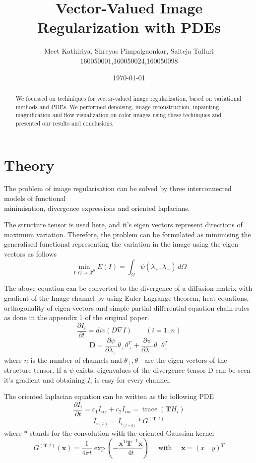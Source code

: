 \documentclass[a4paper]{article}
\title{Vector-Valued Image Regularization with PDEs}
\author{Meet Kathiriya, Shreyas Pimpalgaonkar, Saiteja Talluri \\ 160050001,160050024,160050098}
\date{\today}
\begin{document}
\maketitle

\begin{abstract}

We focussed on techiniques for vector-valued image regularization, based on variational methods and PDEs. We performed denoising, image reconstruction, inpainting, magnification and flow visualization on color images using these techinques and presented our results and conclusions.
\end{abstract}

\section{Theory}
\label{sec:theory}
\hspace{5mm}The problem of image regularisation can be solved by three interconnected models of functional \\ minimisation, divergence expressions and oriented laplacians. 

The structure tensor is used here, and it's eigen vectors represent directions of maximum variation. Therefore, the problem can be formulated as minimising the generalised functional representing the variation in the image using the eigen vectors as follows
$$\min_{I:\Omega\to\mathcal{R}^{n}} E(I) = \int_{\Omega} \psi(\lambda_{+},\lambda_{-})\,d\Omega$$

 The above equation can be converted to the divergence of a diffusion matrix with gradient of the Image channel by using Euler-Lagrange theorem, heat equations, orthogonality of eigen vectors and simple partial differential equation chain rules as done in the appendix 1 of the original paper. 
        $$\frac{\partial I_i}{\partial t} = div ( D \nabla I )          \qquad  (i = 1..n) $$ 
        $$ \textbf{D} = \frac{\partial \psi}{\partial \lambda_+} \theta_+ \theta_+^T  +  \frac{\partial \psi}{\partial \lambda_-} \theta_- \theta_-^T$$
    where $n$ is the number of channels and $\theta_+,\theta_-$ are the eigen vectors of the structure tensor. If a $\psi$ exists, eigenvalues of the divergence tensor D can be seen it's gradient and obtaining $I_i$ is easy for every channel.
    
The oriented laplacian equation can be written as the following PDE
$$\frac { \partial I _ { i } } { \partial t } = c _ { 1 } I _ { i \epsilon \varepsilon } + c _ { 2 } I _ { i m } = \operatorname { trace } \left( \mathbf { T } H _ { i } \right)$$
 $$ I _ { i ( t ) } = I _ { i _ { ( t = 0 ) } } * G ^ { ( \mathbf { T } , t ) }$$ 
where $*$ stands for the convolution with the oriented Gaussian kernel 
$$G ^ { ( \mathbf { T } , t ) } ( \mathbf { x } ) = \frac { 1 } { 4 \pi t } \exp \left( - \frac { \mathbf { x } ^ { T } \mathbf { T } ^ { - 1 } \mathbf { x } } { 4 t } \right) \quad \text { with } \quad \mathbf { x } = ( x \quad y ) ^ { T }$$
\end{document}

